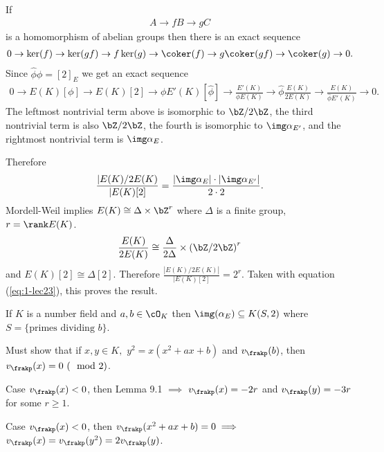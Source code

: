 \begin{prf}
	If
	\begin{align*}
		A \to{f} B \to{g} C
	\end{align*}
	is a homomorphism of abelian groups then there is an exact sequence
	\begin{align*}
		0 \to \ker(f) \to \ker(gf) \to{f} \ker(g) \to \coker(f) \to{g} \coker(gf) \to \coker(g) \to 0.
	\end{align*}
	Since $\hat{\phi}\phi = [2]_E$ we get an exact sequence
	\begin{align*}
		0 \to E(K)[\phi] \to E(K)[2] \to{\phi} E'(K)[\hat{\phi}] \to \frac{E'(K)}{\phi E(K)} \to{\hat{\phi}} \frac{E(K)}{2E(K)} \to \frac{E(K)}{\hat{\phi}E'(K)} \to 0.
	\end{align*}
	The leftmost nontrivial term above is isomorphic to $\bZ/2\bZ$, the third nontrivial term is also $\bZ/2\bZ$, the fourth is isomorphic to $\img \alpha_{E'}$, and the rightmost nontrivial term is $\img \alpha_E$.

	Therefore
	\begin{align*}\label{eq:1-lec23}
		\frac{|E(K)/2E(K)}{|E(K)[2]} = \frac{|\img \alpha_E| \cdot |\img \alpha_{E'}|}{2\cdot 2}.
	\end{align*}
	Mordell-Weil implies $E(K) \cong \Delta \times \bZ^r$ where $\Delta$ is a finite group, $r = \rank E(K)$.
	\begin{align*}
		\frac{E(K)}{2E(K)} \cong \frac{\Delta}{2\Delta} \times \left(\bZ/2\bZ\right)^r
	\end{align*}
	and $E(K)[2] \cong \Delta[2]$. Therefore $\frac{|E(K)/2E(K)|}{|E(K)[2]} = 2^r$. Taken with equation (\ref{eq:1-lec23}), this proves the result.
\end{prf}
\begin{lem}\label{lem:16-4}
	If $K$ is a number field and $a,b \in \cO_K$ then $\img(\alpha_E) \subseteq K(S,2)$ where $S = \{\text{primes dividing $b$}\}$.
\end{lem}
\begin{prf}
	Must show that if $x,y \in K,$ $y^2 = x(x^2 + ax + b)$ and $v_\frakp(b)$, then $v_\frakp(x) = 0 ~(\mod 2)$.

	Case $v_\frakp(x) < 0$, then Lemma 9.1 $\implies$ $v_\frakp(x) = -2r$ and $v_\frakp(y) = -3r$ for some $r \geq 1$.

	Case $v_\frakp(x) < 0$, then $v_\frakp(x^2 + ax + b) = 0 \implies $ $v_\frakp(x) = v_\frakp(y^2) = 2v_{\frakp}(y)$.
\end{prf}

